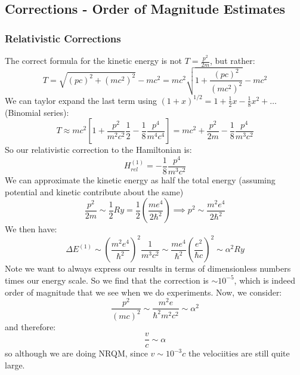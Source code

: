 \subsection{Corrections - Order of Magnitude Estimates}

\subsubsection{Relativistic Corrections}
The correct formula for the kinetic energy is not $T = \frac{p^2}{2m}$, but rather:
\begin{equation}
    T = \sqrt{(pc)^2 + (mc^2)^2} - mc^2 = mc^2\sqrt{1 + \frac{(pc)^2}{(mc^2)^2}} - mc^2
\end{equation}
We can taylor expand the last term using $(1+x)^{1/2} = 1 + \frac{1}{2}x - \frac{1}{8}x^2 + \ldots$ (Binomial series):
\begin{equation}
    T \approx mc^2\left[1 + \frac{p^2}{m^2c^2}\frac{1}{2} - \frac{1}{8}\frac{p^4}{m^4c^4}\right] = mc^2 + \frac{p^2}{2m} - \frac{1}{8}\frac{p^4}{m^3c^2}
\end{equation}
So our relativistic correction to the Hamiltonian is:
\begin{equation}
    H^{(1)}_{rel} = -\frac{1}{8}\frac{p^4}{m^3c^2}
\end{equation}
We can approximate the kinetic energy as half the total energy (assuming potential and kinetic contribute about the same)
\begin{equation}
    \frac{p^2}{2m} \sim \frac{1}{2}\si{Ry} = \frac{1}{2}\left(\frac{me^4}{2\hbar^2}\right) \implies p^2 \sim \frac{m^2e^4}{2\hbar^2}
\end{equation}
We then have:
\begin{equation}
    \Delta E^{(1)} \sim \left(\frac{m^2e^4}{\hbar^2}\right)^2\frac{1}{m^3c^2} \sim \frac{me^4}{\hbar^2}\left(\frac{e^2}{\hbar c}\right)^2 \sim \alpha^2 \si{Ry}
\end{equation}
Note we want to always express our results in terms of dimensionless numbers times our energy scale. So we find that the correction is $\sim 10^{-5}$, which is indeed order of magnitude that we see when we do experiments. Now, we consider:
\begin{equation}
    \frac{p^2}{(mc)^2} \sim \frac{m^2e}{\hbar^2m^2c^2} \sim \alpha^2
\end{equation}
and therefore:
\begin{equation}
    \frac{v}{c}\sim \alpha
\end{equation}
so although we are doing NRQM, since $v \sim 10^{-3}c$ the velociities are still quite large.


